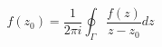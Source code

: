 \documentclass{article}
\begin{document}
\thispagestyle{empty}

$$
f(z_0) = \frac{1}{2\pi i} \oint_{\Gamma} \frac{f(z)}{z - z_0} dz
$$
\end{document}
